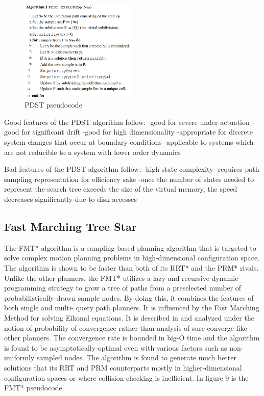 \documentclass[conference]{IEEEtran} \usepackage[T1]{fontenc} \usepackage[backend=biber, style=ieee]{biblatex}
\begin{document}
\begin{figure}
\label{figure8} 
\centering 
\includegraphics[width=0.49\textwidth]{pdst}
\caption{PDST pseudocode}
\end{figure}

Good features of the PDST algorithm follow:
-good for severe under-actuation
-good for significant drift
-good for high dimensionality
-appropriate for discrete system changes that occur at boundary conditions
-applicable to systems which are not reducible to a system with lower order dynamics

Bad features of the PDST algorithm follow:
-high state complexity
-requires path sampling representation for efficiency sake
-once the number of states needed to represent the search tree exceeds the size of the virtual memory, the speed decreases significantly due to disk accesses

\subsection{Fast Marching Tree Star} \label{FMT*}
The FMT* algorithm is a sampling-based planning algorithm that is targeted to solve complex motion planning problems in high-dimensional configuration space. The
algorithm is shown to be faster than both of its RRT* and the PRM* rivals. Unlike the other planners, the FMT* utilizes a lazy and recursive dynamic programming 
strategy to grow a tree of paths from a preselected number of probabilistically-drawn sample nodes. By doing this, it combines the features of both single and multi-
query path planners. It is influenced by the Fast Marching Method for solving Eikonal equations. It is described in \cite{fmt_star} and analyzed under the
notion of probability of convergence rather than analysis of sure converge like other planners. The convergence rate is bounded in big-O time and the algorithm
is found to be asymptotically-optimal even with various factors such as non-uniformly sampled nodes. The algorithm is found to generate much better solutions
that its RRT and PRM counterparts mostly in higher-dimensional configuration spaces or where collision-checking is inefficient. In figure 9 is the FMT* pseudocode.
\end{document}

